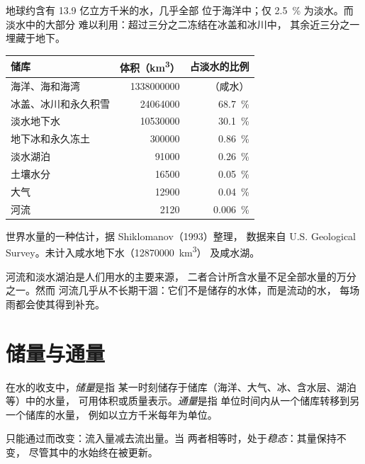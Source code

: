 地球约含有 13.9 亿立方千米的水，几乎全部
位于海洋中；仅 \qty{2.5}{\percent} 为淡水。而淡水中的大部分
难以利用：超过三分之二冻结在冰盖和冰川中，
其余近三分之一埋藏于地下。

\begin{center}
\small
\begin{tabular}{|l|r|r|}
\hline
\textbf{储库} & \textbf{体积（\unit{km^3}）} & \textbf{占淡水的比例} \\ \hline
海洋、海和海湾 & \num{1338000000} & （咸水） \\ \hline
冰盖、冰川和永久积雪 & \num{24064000} & \qty{68.7}{\percent} \\ \hline
淡水地下水 & \num{10530000} & \qty{30.1}{\percent} \\ \hline
地下冰和永久冻土 & \num{300000} & \qty{0.86}{\percent} \\ \hline
淡水湖泊 & \num{91000} & \qty{0.26}{\percent} \\ \hline
土壤水分 & \num{16500} & \qty{0.05}{\percent} \\ \hline
大气 & \num{12900} & \qty{0.04}{\percent} \\ \hline
河流 & \num{2120} & \qty{0.006}{\percent} \\ \hline
\end{tabular}

{\small 世界水量的一种估计，据 Shiklomanov（1993）整理，
数据来自 U.S. Geological Survey。未计入咸水地下水（\num{12870000}~\unit{km^3}）
及咸水湖。}
\end{center}

河流和淡水湖泊是人们用水的主要来源，
二者合计所含水量不足全部水量的万分之一。然而
河流几乎从不长期干涸：它们不是储存的水体，而是流动的水，
每场雨都会使其得到补充。

\section{储量与通量}

\begin{definition}[储量；通量]\label{def:g10:freshwater-resources:stock}
在水的收支中，\emph{储量}是指
某一时刻储存于储库（海洋、大气、冰、含水层、湖泊等）中的水量，
可用体积或质量表示。\emph{通量}是指
单位时间内从一个储库转移到另一个储库的水量，
例如以立方千米每年为单位。
\end{definition}

只能通过而改变：流入量减去流出量。当
两者相等时，处于\emph{稳态}：其量保持不变，
尽管其中的水始终在被更新。

